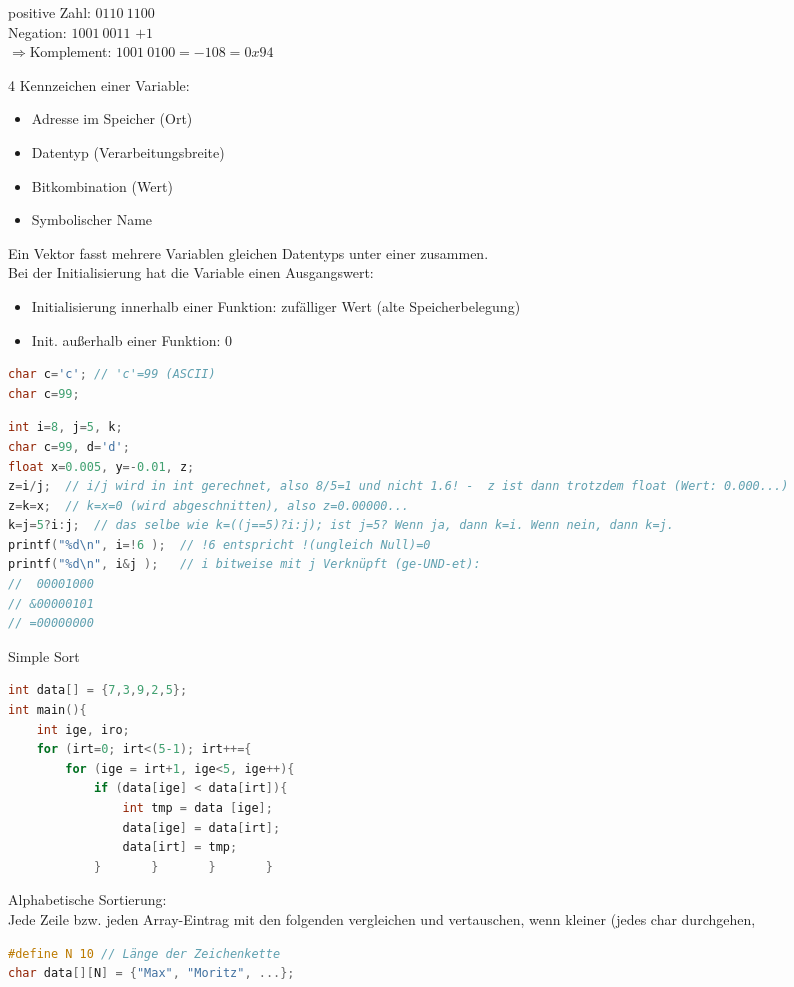 \begin{multicols*}{3}
positive Zahl: $0110 \: 1100$\\
Negation: $1001\: 0011$\; $+1$\\
$\Rightarrow$Komplement: $1001 \: 0100 = -108 = 0x94$

4 Kennzeichen einer Variable:
\begin{itemize}
\item Adresse im Speicher (Ort)
\item Datentyp (Verarbeitungsbreite)
\item Bitkombination (Wert)
\item Symbolischer Name
\end{itemize}
Ein Vektor fasst mehrere Variablen gleichen Datentyps unter einer zusammen.\smallskip\\
Bei der Initialisierung hat die Variable einen Ausgangswert:
\begin{itemize}
\item Initialisierung innerhalb einer Funktion: zufälliger Wert (alte Speicherbelegung)
\item Init. außerhalb einer Funktion: 0
\end{itemize}
\begin{lstlisting}[language=C]
char c='c';	// 'c'=99 (ASCII)
char c=99;
\end{lstlisting}
\begin{lstlisting}[language=C]
int i=8, j=5, k;
char c=99, d='d';
float x=0.005, y=-0.01, z;
z=i/j;	// i/j wird in int gerechnet, also 8/5=1 und nicht 1.6! -  z ist dann trotzdem float (Wert: 0.000...)
z=k=x;	// k=x=0 (wird abgeschnitten), also z=0.00000...
k=j=5?i:j;	// das selbe wie k=((j==5)?i:j); ist j=5? Wenn ja, dann k=i. Wenn nein, dann k=j.
printf("%d\n", i=!6 );	// !6 entspricht !(ungleich Null)=0
printf("%d\n", i&j );	// i bitweise mit j Verknüpft (ge-UND-et):
//  00001000
// &00000101
// =00000000
\end{lstlisting}
\HRule[4pt]
Simple Sort
\begin{lstlisting}[language=C]
int data[] = {7,3,9,2,5};
int main(){
	int ige, iro;
	for (irt=0; irt<(5-1); irt++={
		for (ige = irt+1, ige<5, ige++){
			if (data[ige] < data[irt]){
				int tmp = data [ige];
				data[ige] = data[irt];
				data[irt] = tmp;
			}		}		}		}
\end{lstlisting}
Alphabetische Sortierung:\\
Jede Zeile bzw. jeden Array-Eintrag mit den folgenden vergleichen und vertauschen, wenn kleiner (jedes char durchgehen, 
\begin{lstlisting}[language=C]
#define N 10 // Länge der Zeichenkette
char data[][N] = {"Max", "Moritz", ...};


\end{lstlisting}
\end{multicols*}
